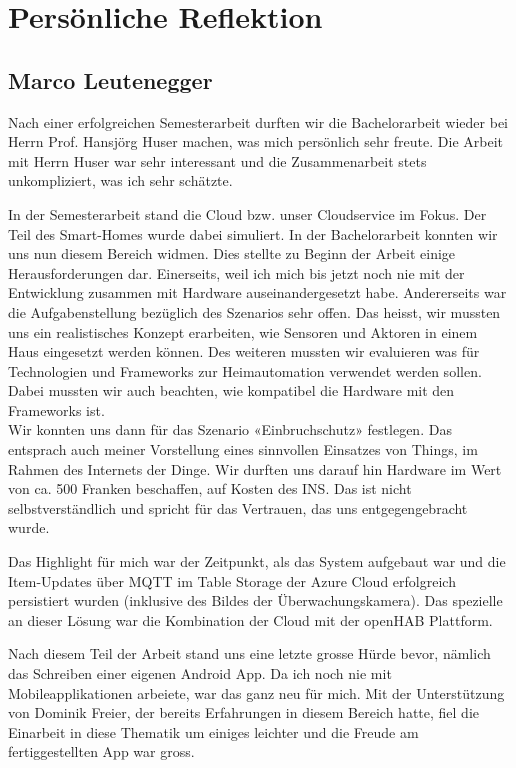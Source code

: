 \pagebreak
\section{Persönliche Reflektion}

\subsection*{Marco Leutenegger}
Nach einer erfolgreichen Semesterarbeit durften wir die Bachelorarbeit wieder bei Herrn Prof. Hansjörg Huser machen, was mich persönlich sehr freute. Die Arbeit mit Herrn Huser war sehr interessant und die Zusammenarbeit stets unkompliziert, was ich sehr schätzte.

In der Semesterarbeit stand die Cloud bzw. unser Cloudservice im Fokus. Der Teil des Smart-Homes wurde dabei simuliert. In der Bachelorarbeit konnten wir uns nun diesem Bereich widmen. Dies stellte zu Beginn der Arbeit einige Herausforderungen dar. Einerseits, weil ich mich bis jetzt noch nie mit der Entwicklung zusammen mit Hardware auseinandergesetzt habe. Andererseits war die Aufgabenstellung bezüglich des Szenarios sehr offen. Das heisst, wir mussten uns ein realistisches Konzept erarbeiten, wie Sensoren und Aktoren in einem Haus eingesetzt werden können. Des weiteren mussten wir evaluieren was für Technologien und Frameworks zur Heimautomation verwendet werden sollen. Dabei mussten wir auch beachten, wie kompatibel die Hardware mit den Frameworks ist. \\
Wir konnten uns dann für das Szenario «Einbruchschutz» festlegen. Das entsprach auch meiner Vorstellung eines sinnvollen Einsatzes von Things, im Rahmen des Internets der Dinge. Wir durften uns darauf hin Hardware im Wert von ca. 500 Franken beschaffen, auf Kosten des INS. Das ist nicht selbstverständlich und spricht für das Vertrauen, das uns entgegengebracht wurde.

Das Highlight für mich war der Zeitpunkt, als das System aufgebaut war und die Item-Updates über MQTT im Table Storage der Azure Cloud erfolgreich persistiert wurden (inklusive des Bildes der Überwachungskamera). Das spezielle an dieser Lösung war die Kombination der Cloud mit der openHAB Plattform.

Nach diesem Teil der Arbeit stand uns eine letzte grosse Hürde bevor, nämlich das Schreiben einer eigenen Android App. Da ich noch nie mit Mobileapplikationen arbeiete, war das ganz neu für mich. Mit der Unterstützung von Dominik Freier, der bereits Erfahrungen in diesem Bereich hatte, fiel die Einarbeit in diese Thematik um einiges leichter und die Freude am fertiggestellten App war gross.

